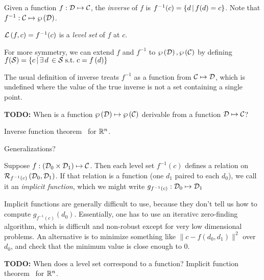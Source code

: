 \label{sec:Inverses-and-pseudo-inverses}

Given a function $f : \mathcal{D} \mapsto \mathcal{C}$,
the \textit{inverse} of $f$ is 
$f^{-1}(c) =  \left\{ d \, | \, f(d) = c \right\} $.
Note that $f^{-1} : \mathcal{C}  \mapsto  \wp \left( \mathcal{D} \right) $.

$\mathcal{L}\left( f , c \right) = f^{-1}(c)$ is a \textit{level set} of
$f$ at $c$.

For more symmetry, we can extend $f$ and $f^{-1}$ to 
$ \wp \left( \mathcal{D} \right)   ,  \wp \left( \mathcal{C} \right) $
by defining
$f(\mathcal{S}) = 
 \left\{ c \, | \, \exists \, d \, \in \mathcal{S} \; \text{s.t.} \; c = f \left( d \right) \right\} $

The usual definition of inverse treats $f^{-1}$
as a function from $\mathcal{C} \mapsto \mathcal{D}$,
which is undefined where the value of the true
inverse is not a set containing a single point.

\textbf{TODO:} When is a function 
$ \wp \left( \mathcal{D} \right)   \mapsto  \wp \left( \mathcal{C} \right) $
derivable from a function $\mathcal{D} \mapsto \mathcal{C}$?

Inverse function theorem~\cite[Theorem~2-1]{spivak-1965}
for $\mathbb{R}^n$. 

Generalizations?~\cite{wiki:Inverse-function-theorem}

\label{sec:Implicit-functions}

Suppose 
$f : \left( \mathcal{D}_0 \times \mathcal{D}_1 \right) \mapsto \mathcal{C}$.
Then each level set $f^{-1}\left( c \right)$ defines a relation on 
$\mathcal{R}_{f^{-1}(c)} \left( \mathcal{D}_0 , \mathcal{D}_1 \right)$.
If that relation is a function
(one $d_1$ paired to each $d_0$),
we call it an \textit{implicit function},
which we might write $g_{f^{-1}(c)} : \mathcal{D}_0 \mapsto \mathcal{D}_1$

Implicit functions are generally difficult to use,
because they don't tell us how to compute 
$g_{f^{-1}(c)} \left( d_0 \right)$.
Essentially, one has to use an iterativc zero-finding 
algorithm, which is difficult and non-robust except
for very low dimensional problems.
An alternative is to minimize something like
$\| c - f\left( d_0, d_1 \right) \|^2$ over $d_0$,
and check that the minimum value is close enough to $0$.

\textbf{TODO:} When does a level set correspond to a function?
Implicit function theorem~\cite[Theorem~2-2]{spivak-1965}
for $\mathbb{R}^n$. 

